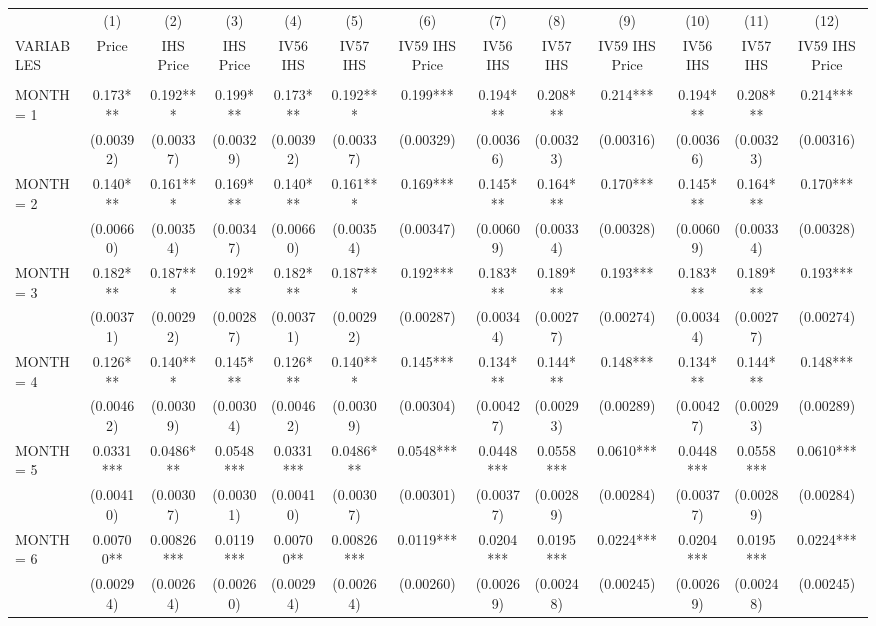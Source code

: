 \begin{tabular}{lcccccccccccc} \hline
 & (1) & (2) & (3) & (4) & (5) & (6) & (7) & (8) & (9) & (10) & (11) & (12) \\
VARIABLES & Price & IHS Price & IHS Price & IV56 IHS & IV57 IHS & IV59 IHS Price & IV56 IHS & IV57 IHS & IV59 IHS Price & IV56 IHS & IV57 IHS & IV59 IHS Price \\ \hline
 &  &  &  &  &  &  &  &  &  &  &  &  \\
MONTH = 1 & 0.173*** & 0.192*** & 0.199*** & 0.173*** & 0.192*** & 0.199*** & 0.194*** & 0.208*** & 0.214*** & 0.194*** & 0.208*** & 0.214*** \\
 & (0.00392) & (0.00337) & (0.00329) & (0.00392) & (0.00337) & (0.00329) & (0.00366) & (0.00323) & (0.00316) & (0.00366) & (0.00323) & (0.00316) \\
MONTH = 2 & 0.140*** & 0.161*** & 0.169*** & 0.140*** & 0.161*** & 0.169*** & 0.145*** & 0.164*** & 0.170*** & 0.145*** & 0.164*** & 0.170*** \\
 & (0.00660) & (0.00354) & (0.00347) & (0.00660) & (0.00354) & (0.00347) & (0.00609) & (0.00334) & (0.00328) & (0.00609) & (0.00334) & (0.00328) \\
MONTH = 3 & 0.182*** & 0.187*** & 0.192*** & 0.182*** & 0.187*** & 0.192*** & 0.183*** & 0.189*** & 0.193*** & 0.183*** & 0.189*** & 0.193*** \\
 & (0.00371) & (0.00292) & (0.00287) & (0.00371) & (0.00292) & (0.00287) & (0.00344) & (0.00277) & (0.00274) & (0.00344) & (0.00277) & (0.00274) \\
MONTH = 4 & 0.126*** & 0.140*** & 0.145*** & 0.126*** & 0.140*** & 0.145*** & 0.134*** & 0.144*** & 0.148*** & 0.134*** & 0.144*** & 0.148*** \\
 & (0.00462) & (0.00309) & (0.00304) & (0.00462) & (0.00309) & (0.00304) & (0.00427) & (0.00293) & (0.00289) & (0.00427) & (0.00293) & (0.00289) \\
MONTH = 5 & 0.0331*** & 0.0486*** & 0.0548*** & 0.0331*** & 0.0486*** & 0.0548*** & 0.0448*** & 0.0558*** & 0.0610*** & 0.0448*** & 0.0558*** & 0.0610*** \\
 & (0.00410) & (0.00307) & (0.00301) & (0.00410) & (0.00307) & (0.00301) & (0.00377) & (0.00289) & (0.00284) & (0.00377) & (0.00289) & (0.00284) \\
MONTH = 6 & 0.00700** & 0.00826*** & 0.0119*** & 0.00700** & 0.00826*** & 0.0119*** & 0.0204*** & 0.0195*** & 0.0224*** & 0.0204*** & 0.0195*** & 0.0224*** \\
 & (0.00294) & (0.00264) & (0.00260) & (0.00294) & (0.00264) & (0.00260) & (0.00269) & (0.00248) & (0.00245) & (0.00269) & (0.00248) & (0.00245) \\

\end{tabular}
